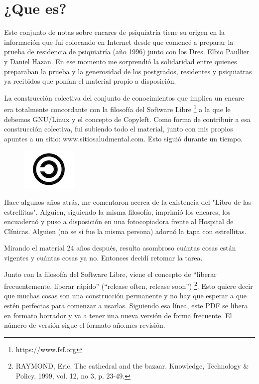 \chapter{¿Que es?}
Este conjunto de notas sobre encares de psiquiatría tiene su origen en la información que fui colocando en Internet desde que comencé a preparar la prueba de residencia de psiquiatría (año 1996) junto con los Dres. Elbio Paullier y Daniel Hazan. En ese momento me sorprendió la solidaridad entre quienes preparaban la prueba y la generosidad de los postgrados, residentes y psiquiatras ya recibidos que ponían el material propio a disposición.

La construcción colectiva del conjunto de conocimientos que implica un encare era totalmente concordante con la filosofía del Software Libre \footnote{https://www.fsf.org} a la que le debemos GNU/Linux y el concepto de Copyleft. Como forma de contribuir a esa construcción colectiva, fui subiendo todo el material, junto con mis propios apuntes a un sitio: www.sitiosaludmental.com. Esto siguió durante un tiempo.
\begin{figure}
	\centering
	\includegraphics{copyleft.png}
\end{figure}
Hace algunos años atrás, me comentaron acerca de la existencia del "Libro de las estrellitas". Alguien, siguiendo la misma filosofía, imprimió los encares, los encuadernó y puso a disposición en una fotocopiadora frente al Hospital de Clínicas. Alguien (no se si fue la misma persona) adornó la tapa con estrellitas.

Mirando el material 24 años después, resulta asombroso cuántas cosas están vigentes y cuántas cosas ya no. Entonces decidí retomar la tarea.

Junto con la filosofía del Software Libre, viene el concepto de ``liberar frecuentemente, liberar rápido'' (``release often, release soon'') \footnote{RAYMOND, Eric. The cathedral and the bazaar. Knowledge, Technology \& Policy, 1999, vol. 12, no 3, p. 23-49.}. Esto quiere decir que muchas cosas son una construcción permanente y no hay que esperar a que estén perfectas para comenzar a usarlas. Siguiendo esa línea, este PDF se libera en formato borrador y va a tener una nueva versión de forma frecuente. El número de versión sigue el formato año.mes-revisión.
